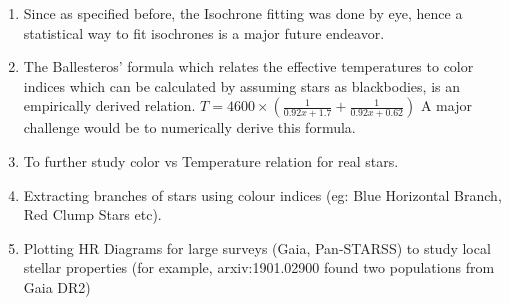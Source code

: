 \documentclass{article}
\begin{document}
\begin{enumerate}
\item Since as specified before, the Isochrone fitting was done by eye, hence a statistical way to fit isochrones is a major future endeavor.
\item The Ballesteros' formula \parencite{Ballesteros_2012} which relates the effective temperatures to color indices which can be calculated by assuming stars as blackbodies, is an empirically derived relation. \newline
     $T = 4600\times(\frac{1}{0.92x + 1.7} + \frac{1}{0.92x + 0.62})$ \newline
A major challenge would be to numerically derive this formula.
\item To further study color vs Temperature relation for real stars.
\item Extracting branches of stars using colour indices (eg: Blue Horizontal Branch, Red Clump Stars etc).
\item Plotting HR Diagrams for large surveys (Gaia, Pan-STARSS) to study local stellar properties (for example, arxiv:1901.02900 found two populations from Gaia DR2)
\newline
\printbibliography
     
\end{enumerate}
\end{document}
